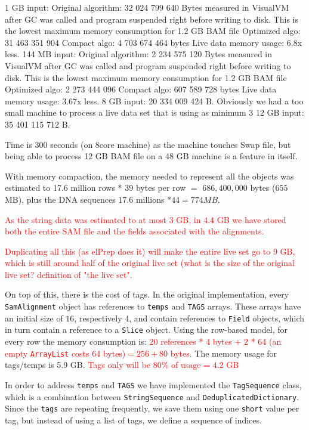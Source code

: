 \documentclass[a4paper,twoside]{article}
\begin{document}
1 GB input:
Original algorithm: 32 024 799 640 Bytes measured in VisualVM after GC was called and program suspended right before writing to disk. This is the lowest maximum memory consumption for 1.2 GB BAM file
Optimized algo: 31 463 351 904
Compact algo: 4 703 674 464 bytes	
Live data memory usage: 6.8x less.
144 MB input:
Original algorithm: 2 234 575 120 Bytes measured in VisualVM after GC was called and program suspended right before writing to disk. This is the lowest maximum memory consumption for 1.2 GB BAM file
Optimized algo: 2 273 444 096
Compact algo: 607 589 728 bytes	
Live data memory usage: 3.67x less.
8 GB input: 20 334 009 424 B.
Obviously we had a too small machine to process a live data set that is using as minimum 3
12 GB input: 35 401 115 712 B.

Time is 300 seconds (on 8core machine) as the machine touches Swap file, but being able to process 12 GB BAM file on a 48 GB machine is a feature in itself.


With memory compaction, the memory needed to represent all the objects was estimated to 17.6 million rows * $39$ bytes per row $=$ $686,400,000$ bytes ($655$ MB), plus the DNA sequences  $17.6$ millions $* 44 = 774 MB$.

\textcolor{red}{
As the string data was estimated to at most $3$ GB, in $4.4$ GB we have stored both the entire SAM file and the fields associated with the alignments.
}

\textcolor{red}{
Duplicating all this (as elPrep does it) will make the entire live set go to $9$ GB, which is still around half of the original live set (what is the size of the original live set? definition of "the live set".
}

On top of this, there is the cost of tags.
In the original implementation, every {\tt SamAlignment} object has references to {\tt temps} and {\tt TAGS} arrays. These arrays have an initial size of $16$, respectively $4$, and contain references to {\tt Field} objects, which in turn contain a reference to a {\tt Slice} object.
Using the row-based model, for every row the memory consumption is:
\textcolor{red}{20 references * 4 bytes + 2 * 64 (an empty {\tt ArrayList} costs 64 bytes)$= 256 + 80$ bytes.}
The memory usage for tags/temps is 5.9 GB. 
\textcolor{red}{Tags only will be 80\% of usage = 4.2 GB}

In order to address {\tt temps} and {\tt TAGS} we have implemented the {\tt TagSequence} class, which is a combination between {\tt StringSequence} and {\tt DeduplicatedDictionary}.
Since the {\tt tags} are repeating frequently, we save them using one {\tt short} value per tag, but instead of using a list of tags, we define a sequence of indices.
\end{document}
